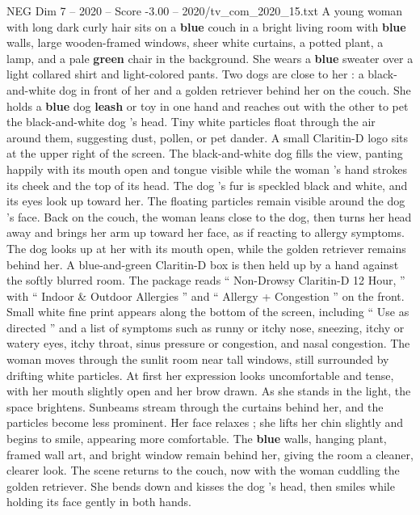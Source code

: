 \begin{textsample}{NEG Dim 7 – 2020 – Score -3.00 – 2020/tv\_com\_2020\_15.txt}  \label{ex:f7_neg_018}
A young woman with long dark curly hair sits on a \textbf{blue} couch in a bright living room with \textbf{blue} walls, large wooden-framed windows, sheer white curtains, a potted plant, a lamp, and a pale \textbf{green} chair in the background.
She wears a \textbf{blue} sweater over a light collared shirt and light-colored pants.
Two dogs are close to her : a black-and-white dog in front of her and a golden retriever behind her on the couch.
She holds a \textbf{blue} dog \textbf{leash} or toy in one hand and reaches out with the other to pet the black-and-white dog ’s head.
Tiny white particles float through the air around them, suggesting dust, pollen, or pet dander.
A small Claritin-D logo sits at the upper right of the screen.
The black-and-white dog fills the view, panting happily with its mouth open and tongue visible while the woman ’s hand strokes its cheek and the top of its head.
The dog ’s fur is speckled black and white, and its eyes look up toward her.
The floating particles remain visible around the dog ’s face.
Back on the couch, the woman leans close to the dog, then turns her head away and brings her arm up toward her face, as if reacting to allergy symptoms.
The dog looks up at her with its mouth open, while the golden retriever remains behind her.
A blue-and-green Claritin-D box is then held up by a hand against the softly blurred room.
The package reads “ Non-Drowsy Claritin-D 12 Hour, ” with “ Indoor \& Outdoor Allergies ” and “ Allergy + Congestion ” on the front.
Small white fine print appears along the bottom of the screen, including “ Use as directed ” and a list of symptoms such as runny or itchy nose, sneezing, itchy or watery eyes, itchy throat, sinus pressure or congestion, and nasal congestion.
The woman moves through the sunlit room near tall windows, still surrounded by drifting white particles.
At first her expression looks uncomfortable and tense, with her mouth slightly open and her brow drawn.
As she stands in the light, the space brightens.
Sunbeams stream through the curtains behind her, and the particles become less prominent.
Her face relaxes ; she lifts her chin slightly and begins to smile, appearing more comfortable.
The \textbf{blue} walls, hanging plant, framed wall art, and bright window remain behind her, giving the room a cleaner, clearer look.
The scene returns to the couch, now with the woman cuddling the golden retriever.
She bends down and kisses the dog ’s head, then smiles while holding its face gently in both hands.

\end{textsample}
